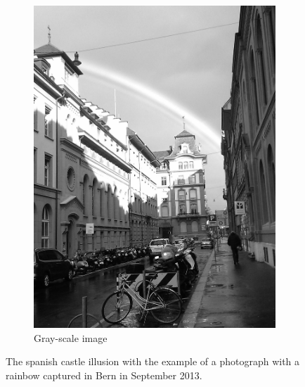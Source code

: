 \documentclass[a4paper]{article}
\begin{document}
\begin{figure}[ht]
\begin{subfigure}[h]{0.48\textwidth}
		\includegraphics[width=\textwidth]{rainbow_gray}
		\caption*{Gray-scale image}
	\end{subfigure}	
\caption{The spanish castle illusion with the example of a photograph with a rainbow captured in Bern in September 2013.}
\label{fig:rainbow}
\end{figure}
\end{document}
